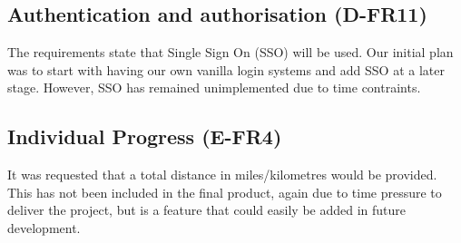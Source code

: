 \subsection{Authentication and authorisation (D-FR11)}
The requirements state that Single Sign On (SSO) will be used. Our initial plan was to start with having our own vanilla login systems and add SSO at a later stage. However, SSO has remained unimplemented due to time contraints. 

\subsection{Individual Progress (E-FR4)}
It was requested that a total distance in miles/kilometres would be provided. This has not been included in the final product, again due to time pressure to deliver the project, but is a feature that could easily be added in future development.

